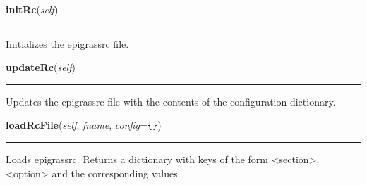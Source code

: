     \vspace{0.5ex}

    \begin{boxedminipage}{\textwidth}

    \raggedright \textbf{initRc}(\textit{self})

    \vspace{-1.5ex}

    \rule{\textwidth}{0.5\fboxrule}
    Initializes the epigrassrc file.

    \vspace{1ex}

    \end{boxedminipage}

    \label{Epigrass:epigrass:MainPanel_Impl:updateRc}

    \vspace{0.5ex}

    \begin{boxedminipage}{\textwidth}

    \raggedright \textbf{updateRc}(\textit{self})

    \vspace{-1.5ex}

    \rule{\textwidth}{0.5\fboxrule}
    Updates the epigrassrc file with the contents of the configuration 
    dictionary.

    \vspace{1ex}

    \end{boxedminipage}

    \label{Epigrass:epigrass:MainPanel_Impl:loadRcFile}

    \vspace{0.5ex}

    \begin{boxedminipage}{\textwidth}

    \raggedright \textbf{loadRcFile}(\textit{self}, \textit{fname}, \textit{config}=\texttt{\{\}})

    \vspace{-1.5ex}

    \rule{\textwidth}{0.5\fboxrule}
    Loads epigrassrc. Returns a dictionary with keys of the form 
    {\textless}section{\textgreater}.{\textless}option{\textgreater} and 
    the corresponding values.

    \vspace{1ex}

    \end{boxedminipage}

